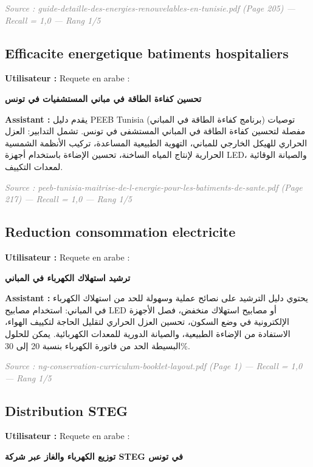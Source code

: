\documentclass[12pt,a4paper,oneside]{article}
\newcommand{\prompt}[1]{%
  \noindent\colorbox{PromptBg}{\parbox{\dimexpr\linewidth-2\fboxsep}{%
    \small\textbf{\textcolor{MainBlue}{Utilisateur :}} #1%
  }}\vspace{3pt}%
}
\newcommand{\botreply}[1]{%
  \noindent\colorbox{OutputBg}{\parbox{\dimexpr\linewidth-2\fboxsep}{%
    \small\textbf{\textcolor{PassGreen!70!black}{Assistant :}} #1%
  }}\vspace{6pt}%
}
\begin{document}
\noindent\small\textit{\textcolor{gray}{Source : guide-detaille-des-energies-renouvelables-en-tunisie.pdf (Page 205) --- Recall = 1,0 --- Rang 1/5}}

\bigskip

\subsection{Efficacite energetique batiments hospitaliers}

\prompt{Requete en arabe :}
{\arabicfont\large\bfseries تحسين كفاءة الطاقة في مباني المستشفيات في تونس}

\botreply{
{\arabicfont يقدم دليل PEEB Tunisia (برنامج كفاءة الطاقة في المباني) توصيات مفصلة لتحسين كفاءة الطاقة في المباني المستشفى في تونس. تشمل التدابير: العزل الحراري للهيكل الخارجي للمباني، التهوية الطبيعية المساعدة، تركيب الأنظمة الشمسية الحرارية لإنتاج المياه الساخنة، تحسين الإضاءة باستخدام أجهزة LED، والصيانة الوقائية لمعدات التكييف.}
}

\noindent\small\textit{\textcolor{gray}{Source : peeb-tunisia-maitrise-de-l-energie-pour-les-batiments-de-sante.pdf (Page 217) --- Recall = 1,0 --- Rang 1/5}}

\bigskip

\subsection{Reduction consommation electricite}

\prompt{Requete en arabe :}
{\arabicfont\large\bfseries ترشيد استهلاك الكهرباء في المباني}

\botreply{
{\arabicfont يحتوي دليل الترشيد على نصائح عملية وسهولة للحد من استهلاك الكهرباء في المباني: استخدام مصابيح LED أو مصابيح استهلاك منخفض، فصل الأجهزة الإلكترونية في وضع السكون، تحسين العزل الحراري لتقليل الحاجة لتكييف الهواء، الاستفادة من الإضاءة الطبيعية، والصيانة الدورية للمعدات الكهربائية. يمكن للحلول البسيطة الحد من فاتورة الكهرباء بنسبة 20 إلى 30\%.}
}

\noindent\small\textit{\textcolor{gray}{Source : ng-conservation-curriculum-booklet-layout.pdf (Page 1) --- Recall = 1,0 --- Rang 1/5}}

\bigskip

\subsection{Distribution STEG}

\prompt{Requete en arabe :}
{\arabicfont\large\bfseries توزيع الكهرباء والغاز عبر شركة STEG في تونس}
\end{document}
